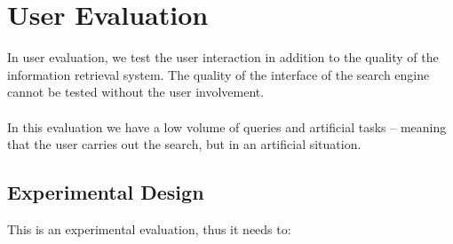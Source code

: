 \documentclass{article}
\begin{document}
\section{User Evaluation}
In user evaluation, we test the user interaction in addition to the quality of the information retrieval system. The quality of the interface of the search engine cannot be tested without the user involvement. \\ \\
In this evaluation we have a low volume of queries and artificial tasks -- meaning that the user carries out the search, but in an artificial situation.

\subsection{Experimental Design}
This is an experimental evaluation, thus it needs to:
\end{document}
